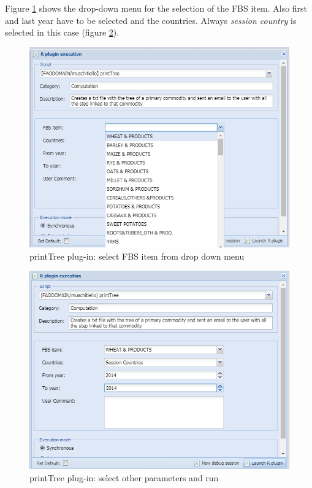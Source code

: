 \documentclass[]{article}
\begin{document}
Figure \ref{fig:f12} shows the drop-down menu for the selection of the
FBS item. Also first and last year have to be selected and the
countries. Always \emph{session country} is selected in this case
(figure \ref{fig:f13}).

\begin{figure}[H]

{\centering \includegraphics[width=0.8\linewidth]{images/printTree/12_selectfbs} 

}

\caption{\label{fig:f12}printTree plug-in: select FBS item from drop down menu}\label{fig:f12}
\end{figure}

\begin{figure}[H]

{\centering \includegraphics[width=0.8\linewidth]{images/printTree/13_launch} 

}

\caption{\label{fig:f13}printTree plug-in: select other parameters and run}\label{fig:f13}
\end{figure}
\end{document}
